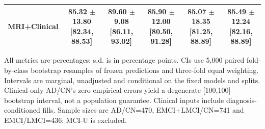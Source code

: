 \begin{landscape}
\begin{longtable}{lccccc}
MRI+Clinical & \shortstack{85.32 $\pm$ 13.80\\{}[82.34, 88.53]} & \shortstack{89.60 $\pm$ 9.08\\{}[86.11, 93.02]} & \shortstack{85.90 $\pm$ 12.00\\{}[80.50, 91.28]} & \shortstack{85.07 $\pm$ 18.35\\{}[81.25, 88.89]} & \shortstack{85.49 $\pm$ 12.24\\{}[82.16, 88.89]} \\
\midrule
\bottomrule
\end{longtable}
\noindent\footnotesize All metrics are percentages; s.d. is in percentage points. CIs use 5,000 paired fold-by-class bootstrap resamples of frozen predictions and three-fold equal weighting. Intervals are marginal, unadjusted and conditional on the fixed models and splits. Clinical-only AD/CN's zero empirical errors yield a degenerate [100,100] bootstrap interval, not a population guarantee. Clinical inputs include diagnosis-conditioned fills. Sample sizes are AD/CN=470, EMCI+LMCI/CN=741 and EMCI/LMCI=436; MCI-U is excluded.
\endgroup
\end{landscape}
